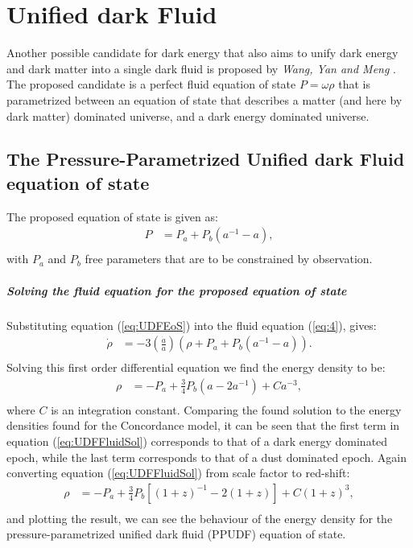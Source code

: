 \documentclass[a4paper, 11pt]{FSKH_623_Report}
\numberwithin{equation}{section}
\newcommand{\brac}[1]{\left(#1\right)}
\newcommand{\bracc}[1]{\left[#1\right]}
\begin{document}
\chapter{Unified dark Fluid}
Another possible candidate for dark energy that also aims to unify dark energy and dark matter into a single dark fluid is proposed by \textit{Wang, Yan and Meng} \citep{wang2017new}. The proposed candidate is a perfect fluid equation of state $P=\omega\rho$ that is parametrized between an equation of state that describes a matter (and here by dark matter) dominated universe, and a dark energy dominated universe. 
\section{The Pressure-Parametrized Unified dark Fluid equation of state}
The proposed equation of state is given as:
\begin{equation}\label{eq:UDFEoS}
\begin{split}
P &= P_{a}+P_{b}\brac{a^{-1}-a},         \\
\end{split}
\end{equation}
with $P_{a}$ and $P_{b}$ free parameters that are to be constrained by observation.
\paragraph{Solving the fluid equation for the proposed equation of state}
Substituting equation (\ref{eq:UDFEoS}) into the fluid equation (\ref{eq:4}), gives:
\begin{equation}\label{eq:UDFFluid}
\begin{split}
\dot{\rho} &= -3\brac{\frac{\dot{a}}{a}}\brac{\rho+P_{a}+P_{b}\brac{a^{-1}-a}}. \\
\end{split}
\end{equation}
Solving this first order differential equation we find the energy density to be:\begin{equation}\label{eq:UDFFluidSol}
\begin{split}
\rho&= -P_{a}+\frac{3}{4}P_{b}\brac{a-2a^{-1}}+Ca^{-3}, \\
\end{split}
\end{equation}
where $C$ is an integration constant. Comparing the found solution to the energy densities found for the Concordance model, it can be seen that the first term in equation (\ref{eq:UDFFluidSol}) corresponds to that of a dark energy dominated epoch, while the last term corresponds to that of a dust dominated epoch.
Again converting equation (\ref{eq:UDFFluidSol}) from scale factor to red-shift:
\begin{equation}\label{eq:UDFFluidSolZ}
\begin{split}
\rho&= -P_{a}+\frac{3}{4}P_{b}\bracc{\brac{1+z}^{-1}-2\brac{1+z}}+C\brac{1+z}^{3}, \\
\end{split}
\end{equation}
and plotting the result, we can see the behaviour of the energy density for the pressure-parametrized unified dark fluid (PPUDF) equation of state.
\end{document}

